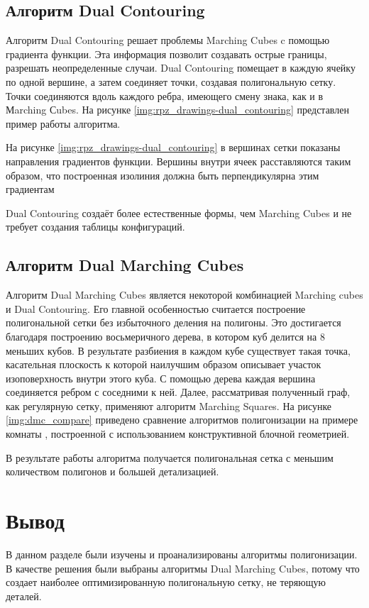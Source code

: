 \subsection{Алгоритм Dual Contouring}

Алгоритм Dual Contouring\cite{dualcontouring} решает проблемы Marching Cubes c помощью градиента функции. Эта информация позволит создавать острые границы, разрешать неопределенные случаи.
Dual Contouring помещает в каждую ячейку по одной вершине, а затем соединяет точки, создавая полигональную сетку. Точки соединяются вдоль каждого ребра, имеющего смену знака, как и в Мarching Сubes. На рисунке \ref{img:rpz_drawings-dual_contouring} представлен пример работы алгоритма. 


На рисунке \ref{img:rpz_drawings-dual_contouring} в вершинах сетки показаны направления градиентов функции. Вершины внутри ячеек расставляются таким образом, что построенная изолиния должна быть перпендикулярна этим градиентам

Dual Contouring создаёт более естественные формы, чем Marching Cubes и не требует создания таблицы конфигураций.

\subsection{Алгоритм Dual Marching Cubes}

Алгоритм Dual Marching Cubes\cite{dmc} является некоторой комбинацией Marching cubes и Dual Contouring. Его главной особенностью считается построение полигональной сетки без избыточного деления на полигоны. Это достигается благодаря построению восьмеричного дерева, в котором куб делится на 8 меньших кубов. В результате разбиения в каждом кубе существует такая точка, касательная плоскость к которой наилучшим образом описывает участок изоповерхность внутри этого куба. С помощью дерева каждая вершина соединяется ребром с соседними к ней. Далее, рассматривая полученный граф, как регулярную сетку, применяют алгоритм Marching Squares. На рисунке \ref{img:dmc_compare} приведено сравнение алгоритмов полигонизации\cite{dmc} на примере комнаты , построенной с использованием конструктивной блочной геометрией.


В результате работы алгоритма получается полигональная сетка с меньшим количеством полигонов и большей детализацией.

\section*{Вывод}
В данном разделе были изучены и проанализированы алгоритмы полигонизации. В качестве решения были выбраны алгоритмы Dual Marching Cubes, потому что создает наиболее оптимизированную полигональную сетку, не теряющую деталей.
